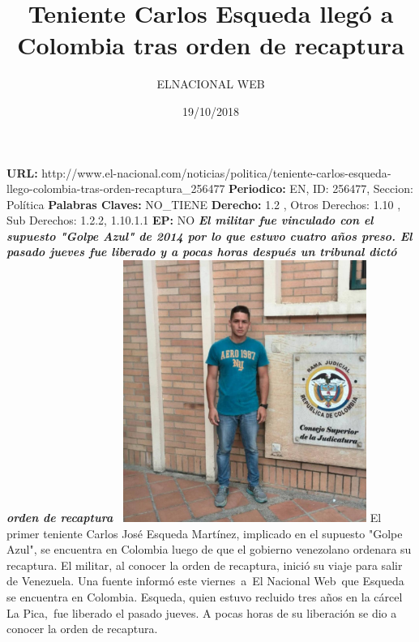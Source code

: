 \documentclass{article}%
\title{\textbf{Teniente Carlos Esqueda llegó a Colombia tras orden de recaptura}}%
\author{ELNACIONAL WEB}%
\date{19/10/2018}%
\begin{document}
%
\normalsize%
\maketitle%
\textbf{URL: }%
http://www.el{-}nacional.com/noticias/politica/teniente{-}carlos{-}esqueda{-}llego{-}colombia{-}tras{-}orden{-}recaptura\_256477\newline%
%
\textbf{Periodico: }%
EN, %
ID: %
256477, %
Seccion: %
Política\newline%
%
\textbf{Palabras Claves: }%
NO\_TIENE\newline%
%
\textbf{Derecho: }%
1.2%
, Otros Derechos: %
1.10%
, Sub Derechos: %
1.2.2, 1.10.1.1%
\newline%
%
\textbf{EP: }%
NO\newline%
\newline%
%
\textbf{\textit{El militar fue vinculado con el supuesto "Golpe Azul" de 2014 por lo que estuvo cuatro años preso. El pasado jueves fue liberado y a pocas horas después un tribunal dictó orden de recaptura~}}%
\newline%
\newline%
%
\includegraphics[width=300px]{157.jpg}%
\newline%
%
El primer teniente Carlos José Esqueda Martínez, implicado en el supuesto "Golpe Azul", se encuentra en Colombia luego de que el gobierno venezolano ordenara su recaptura.%
\newline%
%
El militar, al conocer la orden de recaptura, inició su viaje para salir de Venezuela. Una fuente informó este viernes~a~El Nacional Web~que Esqueda se encuentra en Colombia.%
\newline%
%
Esqueda, quien estuvo recluido tres años en la cárcel La Pica,~fue liberado el pasado jueves. A pocas horas de su liberación se dio a conocer la orden de recaptura.%
\newline%
%
\end{document}
